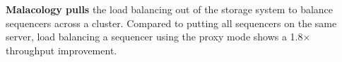 \documentclass[preprint]{sigplanconf-eurosys}
\begin{document}
%
%
%

\noindent\textbf{Malacology pulls} the load balancing out of the storage system
to balance sequencers across a cluster. Compared to putting all sequencers on
the same server, load balancing a sequencer using the proxy mode shows a
1.8\(\times\) throughput improvement.\\
\end{document}
